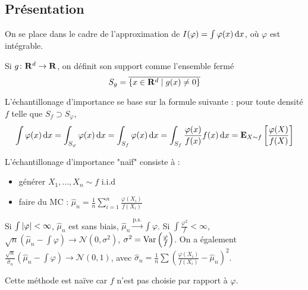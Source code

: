 \subsection{Présentation}

	On se place dans le cadre de l'approximation de $I(\varphi) = \int \varphi(x) \mathop{}\mathopen{}\mathrm{d} x$, où $\varphi$ est intégrable.
	
	\begin{defn}
		Si $g \colon \mathbf{R}^d \to \mathbf{R}$, on définit son support comme l'ensemble fermé
		$$S_g = \overline{\{ x \in \mathbf{R}^d \mid g(x) \neq 0 \} }$$
	\end{defn}
	
	L'échantillonage d'importance se base sur la formule suivante : pour toute densité $f$ telle que $S_f \supset S_{\varphi}$,
	$$\int \varphi(x) \mathop{}\mathopen{}\mathrm{d} x = \int_{S_{\varphi}} \varphi(x) \mathop{}\mathopen{}\mathrm{d} x = \int_{S_f} \varphi(x) \mathop{}\mathopen{}\mathrm{d} x = \int_{S_f} \frac{\varphi(x)}{f(x)} f(x) \mathop{}\mathopen{}\mathrm{d} x = \mathbf{E}_{X \sim f} \left[  \frac{\varphi(X)}{f(X)} \right]$$
	
	L'échantillonage d'importance "naïf" consiste à :
	\begin{itemize}
		\item[\textbullet] générer $X_1,\ldots,X_n \sim f$ i.i.d
		\item[\textbullet] faire du MC : $\hat{\mu}_n = \frac{1}{n} \sum_{i = 1}^n \frac{\varphi(X_i)}{f(X_i)}$
	\end{itemize}
	
	\begin{pop}
		Si $\int \left\lvert\varphi\right\rvert < \infty$, $\hat{\mu}_n$ est sans biais, $\hat{\mu}_n \overset{\text{p.s.}}{\longrightarrow} \int \varphi$.
		Si $\int \frac{\varphi^2}{f} < \infty$, $\sqrt{n} \left( \hat{\mu}_n - \int \varphi \right) \longrightarrow \mathcal{N}(0,\sigma^2)$, $\sigma^2 = \operatorname{Var} \left( \frac{\varphi}{f} \right)$.
		On a également $\frac{\sqrt{n}}{\hat{\sigma}_n} \left( \hat{\mu}_n - \int \varphi \right) \longrightarrow \mathcal{N}(0,1)$, avec $\hat{\sigma}_n = \frac{1}{n} \sum \left( \frac{\varphi(X_i)}{f(X_i)} - \hat{\mu}_n \right)^2$.
	\end{pop}
	
	Cette méthode est naïve car $f$ n'est pas choisie par rapport à $\varphi$.
	
